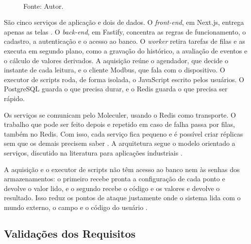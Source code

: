 \begin{figure}[H]
{}
    \vspace{0.2cm} \\
    Fonte: Autor.
\end{figure}

\par São cinco serviços de aplicação e dois de dados. O \emph{front-end}, em Next.js, entrega apenas as telas \cite{NEXTJS_DOCS}. O \emph{back-end}, em Fastify, concentra as regras de funcionamento, o cadastro, a autenticação e o acesso ao banco. O \emph{worker} retira tarefas de filas e as executa em segundo plano, como a gravação do histórico, a avaliação de eventos e o cálculo de valores derivados. A aquisição reúne o agendador, que decide o instante de cada leitura, e o cliente Modbus, que fala com o dispositivo. O executor de scripts roda, de forma isolada, o JavaScript escrito pelos usuários. O PostgreSQL guarda o que precisa durar, e o Redis guarda o que precisa ser rápido.

\par Os serviços se comunicam pelo Moleculer, usando o Redis como transporte. O trabalho que pode ser feito depois e repetido em caso de falha passa por filas, também no Redis. Com isso, cada serviço fica pequeno e é possível criar réplicas sem que os demais precisem saber \cite{BIGHETI2020}. A arquitetura segue o modelo orientado a serviços, discutido na literatura para aplicações industriais \cite{BIGHETI2020}.

\par A aquisição e o executor de scripts não têm acesso ao banco nem às senhas dos armazenamentos: o primeiro recebe pronta a configuração de cada ponto e devolve o valor lido, e o segundo recebe o código e os valores e devolve o resultado. Isso reduz os pontos de ataque justamente onde o sistema lida com o mundo externo, o campo e o código do usuário \cite{STOUFFER2015_NIST_ICS_SECURITY}.

\subsection{Validações dos Requisitos}

